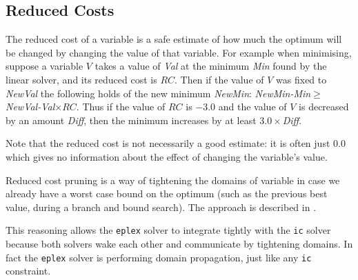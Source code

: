 \subsection{Reduced Costs}
The reduced cost of a variable is a safe estimate of how much the
optimum will be changed by changing the value of that variable.
For example when minimising, suppose a variable $V$ takes a value of
{\em Val} at the minimum {\em Min} found
by the linear solver, and its reduced cost is $RC$. 
Then if the value of $V$ was fixed to {\em NewVal} the following holds of
the new minimum {\em NewMin}:
{\em NewMin-Min}$ \ge ${\em NewVal-Val}$ \times RC$.
Thus if the value of $RC$ is $-3.0$ and the value of $V$ is 
decreased by an
amount {\em Diff}, then the minimum increases by at least 
$3.0 \times ${\em Diff}.

 
Note that the reduced cost is not necessarily a good estimate: it is
often just $0.0$ which gives no information about the effect of
changing the variable's value.

Reduced cost pruning is a way of tightening the domains of variable in
case we already have a worst case bound on the optimum (such as the
previous best value, during a branch and bound search).  The approach
is described in \cite{Milano99}.

This reasoning allows the {\tt eplex} solver to integrate tightly with
the {\tt ic} solver because both solvers wake each other and
communicate by tightening domains.
In fact the {\tt eplex} solver is performing domain propagation, just
like any {\tt ic} constraint.


